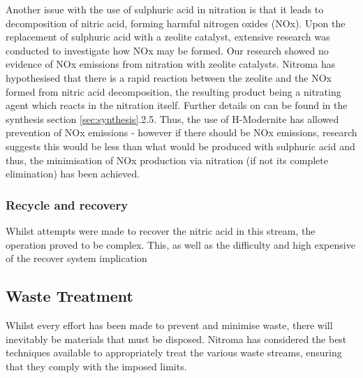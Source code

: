 Another issue with the use of sulphuric acid in nitration is that it leads to decomposition of nitric acid, forming harmful nitrogen oxides (NOx). Upon the replacement of sulphuric acid with a zeolite catalyst, extensive research was conducted to investigate how NOx may be formed. Our research showed no evidence of NOx emissions from nitration with zeolite catalysts. Nitroma has hypothesised that there is a rapid reaction between the zeolite and the NOx formed from nitric acid decomposition, the resulting product being a nitrating agent which reacts in the nitration itself. Further details on can be found in the synthesis section \ref{sec:synthesis}.2.5. Thus, the use of H-Modernite has allowed prevention of NOx emissions - however if there should be NOx emissions, research suggests this would be less than what would be produced with sulphuric acid and thus, the minimisation of NOx production via nitration (if not its complete elimination) has been achieved.  

\subsubsection{Recycle and recovery}


 




Whilst attempts were made to recover the nitric acid in this stream, the operation proved to be complex. This, as well as the difficulty and high expensive of the recover system implication 



\subsection{Waste Treatment}

Whilst every effort has been made to prevent and minimise waste, there will inevitably be materials that must be disposed. Nitroma has considered the best techniques available to appropriately treat the various waste streams, ensuring that they comply with the imposed limits. 

